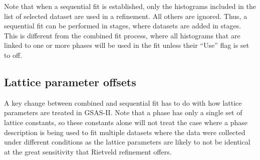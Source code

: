 Note that when a sequential fit is established, only the histograms included in the list of selected  dataset are used in a refinement. All others are ignored. Thus, a sequential fit can be performed in stages, where datasets are added in stages. 
This is  different from the combined fit process, where all histograms that are linked to one or more phases will be used in the fit unless their ``Use'' flag is set to off. 

\subsection{Lattice parameter offsets}\label{ref:dij-seq}
A key change between combined and sequential fit has to do with how lattice parameters are treated in GSAS-II.
Note that a phase has only a single set of lattice constants, so these constants alone will not treat the case where a phase description is being used to fit multiple datasets where the data were collected under different conditions as the lattice parameters are likely to not be identical at the great sensitivity that Rietveld refinement offers. 

